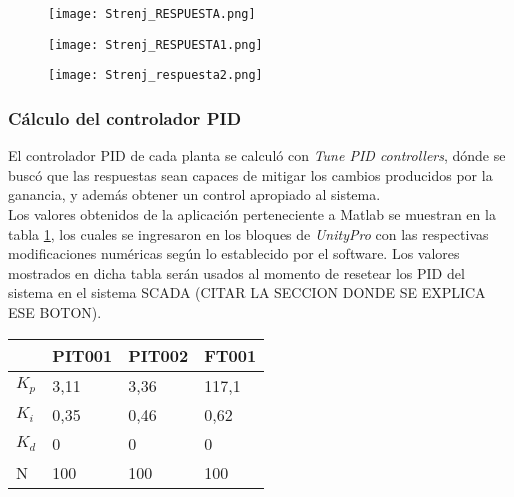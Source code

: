 \begin{figure}[htb]
	\centering
	\texttt{[image: Strenj\_RESPUESTA.png]}
	\label{fig:ft001}
\end{figure}
\begin{figure}[htb]
	\centering
	\texttt{[image: Strenj\_RESPUESTA1.png]}
	\label{fig:PIT001}
\end{figure}




\begin{figure}[htb]
	\centering
	\texttt{[image: Strenj\_respuesta2.png]}
	\label{fig:PIT002}
\end{figure}






\subsubsection{Cálculo del controlador PID}
El controlador PID de cada planta se calculó con \textit{Tune PID controllers}, dónde se buscó que las respuestas sean capaces de mitigar los cambios producidos por la ganancia, y además obtener un control apropiado al sistema. \\

Los valores obtenidos de la aplicación perteneciente a Matlab se muestran en la tabla \ref{tab:pid}, los cuales se ingresaron en los bloques de \textit{UnityPro} con las respectivas modificaciones numéricas según lo establecido por el software. Los valores mostrados en dicha tabla serán usados al momento de resetear los PID del sistema en el sistema SCADA (CITAR LA SECCION DONDE SE EXPLICA ESE BOTON).
\begin{comment}
Se observa que algunos de los controladores PID son del tipo proporcional integrador, dando así ya que la ganancia en los diferentes escalones en la planta no era constante. Al utilizar un PI genera una salida con error de estado estacionario cero. 
\end{comment}

\begin{table}[h]
	\centering
	\begin{tabular}{|l|l|l|l|}
		\hline
		& PIT001 & PIT002 & FT001 \\ \hline
		$K_p$ & 3,11 & 3,36 & 117,1 \\ \hline
		$K_i$ & 0,35 & 0,46 & 0,62 \\ \hline
		$K_d$ & 0 & 0 & 0 \\ \hline
		N & 100 & 100 & 100 \\ \hline
	\end{tabular}
	\label{tab:pid}
\end{table}

